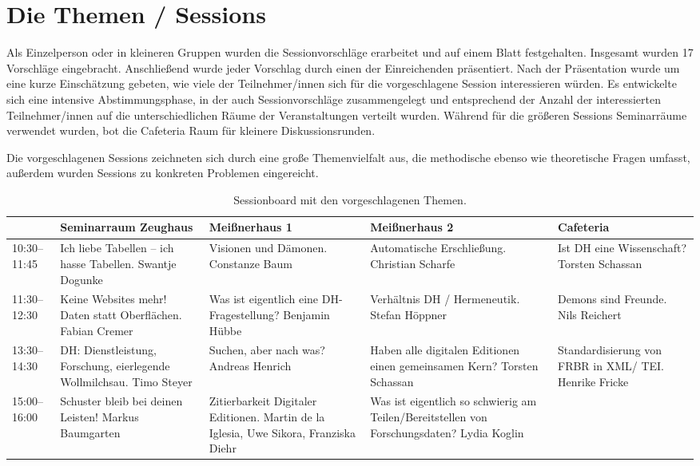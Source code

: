 \documentclass[a4paper,
fontsize=11pt,
oneside,
numbers=noperiodatend,
parskip=half-,
bibliography=totoc,
final
]{scrartcl}
\begin{document}
\hypertarget{die-themen-sessions}{%
\section{Die Themen / Sessions}\label{die-themen-sessions}}

Als Einzelperson oder in kleineren Gruppen wurden die Sessionvorschläge
erarbeitet und auf einem Blatt festgehalten. Insgesamt wurden 17
Vorschläge eingebracht. Anschließend wurde jeder Vorschlag durch einen
der Einreichenden präsentiert. Nach der Präsentation wurde um eine kurze
Einschätzung gebeten, wie viele der Teilnehmer/innen sich für die
vorgeschlagene Session interessieren würden. Es entwickelte sich eine
intensive Abstimmungsphase, in der auch Sessionvorschläge zusammengelegt
und entsprechend der Anzahl der interessierten Teilnehmer/innen auf die
unterschiedlichen Räume der Veranstaltungen verteilt wurden. Während für
die größeren Sessions Seminarräume verwendet wurden, bot die Cafeteria
Raum für kleinere Diskussionsrunden.

Die vorgeschlagenen Sessions zeichneten sich durch eine große
Themenvielfalt aus, die methodische ebenso wie theoretische Fragen
umfasst, außerdem wurden Sessions zu konkreten Problemen eingereicht.

\begin{table}[h]
\centering
\footnotesize
\begin{tabular}{p{1.5cm}p{3cm}p{3cm}p{3cm}p{3cm}}
\toprule
 & \textbf{Seminarraum Zeughaus} & \textbf{Meißnerhaus 1} & \textbf{Meißnerhaus 2} & \textbf{Cafeteria} \\
 \midrule
10:30–11:45 & Ich liebe Tabellen – ich hasse Tabellen. Swantje Dogunke & Visionen und Dämonen. Constanze Baum & Automatische Erschließung. Christian Scharfe & Ist DH eine Wissenschaft? Torsten Schassan \\
\midrule
11:30–12:30 & Keine Websites mehr! Daten statt Oberflächen. Fabian Cremer & Was ist eigentlich eine DH-Fragestellung? Benjamin Hübbe & Verhältnis DH / Hermeneutik. Stefan Höppner & Demons sind Freunde. Nils Reichert \\
\midrule
13:30–14:30 & DH: Dienstleistung, Forschung, eierlegende Wollmilchsau. Timo Steyer & Suchen, aber nach was? Andreas Henrich & Haben alle digitalen Editionen einen gemeinsamen Kern? Torsten Schassan & Standardisierung von FRBR in XML/ TEI. Henrike Fricke \\
\midrule
15:00–16:00 & Schuster bleib bei deinen Leisten! Markus Baumgarten & Zitierbarkeit Digitaler Editionen. Martin de la Iglesia, Uwe Sikora, Franziska Diehr & Was ist eigentlich so schwierig am Teilen/Bereitstellen von Forschungsdaten? Lydia Koglin & ~ \\
\bottomrule
\end{tabular}
\caption{Sessionboard mit den vorgeschlagenen Themen.}
\label{tab:1}
\end{table}
\end{document}
